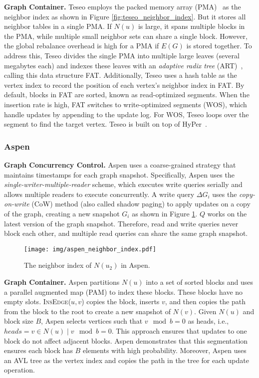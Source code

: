 \noindent\textbf{Graph Container.} Teseo employs the packed memory array (PMA)~\cite{bender2007adaptive,de2019packed} as the neighbor index as shown in Figure \ref{fig:teseo_neighbor_index}. But it stores all neighbor tables in a single PMA. If $N(u)$ is large, it spans multiple blocks in the PMA, while multiple small neighbor sets can share a single block. However, the global rebalance overhead is high for a PMA if $E(G)$ is stored together. To address this, Teseo divides the single PMA into multiple large leaves (several megabytes each) and indexes these leaves with an \emph{adaptive radix tree} (ART)~\cite{leis2013adaptive}, calling this data structure FAT. Additionally, Teseo uses a hash table as the vertex index to record the position of each vertex's neighbor index in FAT. By default, blocks in FAT are sorted, known as read-optimized segments. When the insertion rate is high, FAT switches to write-optimized segments (WOS), which handle updates by appending to the update log. For WOS, Teseo loops over the segment to find the target vertex. Teseo is built on top of HyPer~\cite{kemper2011hyper}.

\subsubsection{\textbf{Aspen}~\cite{dhulipala2019low}}

\textbf{Graph Concurrency Control.} Aspen uses a coarse-grained strategy that maintains timestamps for each graph snapshot. Specifically, Aspen uses the \emph{single-writer-multiple-reader} scheme, which executes write queries serially and allows multiple readers to execute concurrently. A write query $\Delta G_i$ uses the \emph{copy-on-write} (CoW) method (also called shadow paging) to apply updates on a copy of the graph, creating a new snapshot $G_i$ as shown in Figure \ref{fig:aspen_neighbor_index}. $Q$ works on the latest version of the graph snapshot. Therefore, read and write queries never block each other, and multiple read queries can share the same graph snapshot.

\begin{figure}[h]\small
    \setlength{\abovecaptionskip}{3pt}
    \setlength{\belowcaptionskip}{-5pt}
    \texttt{[image: img/aspen\_neighbor\_index.pdf]}
    \centering
    \caption{The neighbor index of $N(u_2)$ in Aspen.}
    \label{fig:aspen_neighbor_index}
\end{figure}

\vspace{2pt}
\noindent\textbf{Graph Container.} Aspen partitions $N(u)$ into a set of sorted blocks and uses a parallel augmented map (PAM) to index these blocks. These blocks have no empty slots. \textsc{InsEdge($u, v$)} copies the block, inserts $v$, and then copies the path from the block to the root to create a new snapshot of $N(v)$. Given $N(u)$ and block size $B$, Aspen selects vertices such that $v \mod b = 0$ as heads, i.e., $heads = {v \in N(u) \mid v \mod b = 0}$. This approach ensures that updates to one block do not affect adjacent blocks. Aspen demonstrates that this segmentation ensures each block has $B$ elements with high probability. Moreover, Aspen uses an AVL tree as the vertex index and copies the path in the tree for each update operation.

